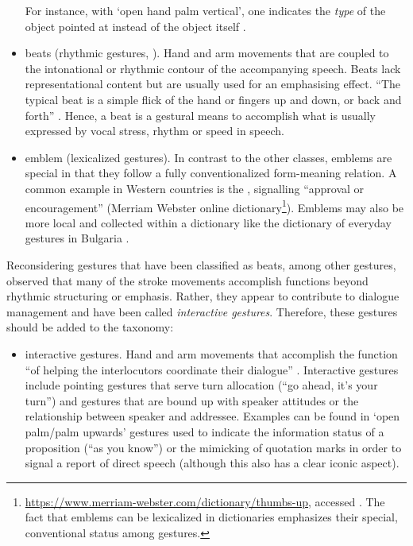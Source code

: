 \documentclass[output=paper]{langsci/langscibook}
\begin{document}
\begin{itemize}
%
For instance, with \enquote*{open hand palm vertical}, one indicates the \emph{type} of the object pointed at instead of the object itself \citep[]{Kendon:Versante:2003}.
\item beats  (rhythmic gestures, ). Hand and arm movements that are coupled to the intonational or rhythmic contour of the accompanying speech. Beats lack representational content but are usually used for an emphasising effect. \enquote{The typical beat is a simple flick of the hand or fingers up and down, or back and forth} \citep[]{McNeill:1992}. Hence, a beat is a gestural means to accomplish what is usually expressed by vocal stress, rhythm or speed in speech. 
\item emblem (lexicalized gestures). In contrast to the other classes, emblems are special in that they follow a fully conventionalized form-meaning relation. A common example in Western countries is the , signalling \enquote{approval or encouragement} (Merriam Webster online dictionary\footnote{\url{https://www.merriam-webster.com/dictionary/thumbs-up}, accessed . The fact that emblems can be lexicalized in dictionaries emphasizes their special, conventional status among gestures.}). Emblems may also be more local and collected within a dictionary like the dictionary of everyday gestures in Bulgaria \citep{Kolarova:2011}.
\end{itemize}


Reconsidering gestures that have been classified as beats, among other gestures, \citet{Bavelas:Chovil:Lawrie:Wade:1992} observed that many of the stroke movements accomplish functions beyond rhythmic structuring or emphasis.
%
Rather, they appear to contribute to dialogue management and have been called \emph{interactive gestures}.
%
Therefore, these gestures should be added to the taxonomy:

\begin{itemize}
\item interactive gestures.  Hand and arm movements that accomplish the function \enquote{of helping the interlocutors coordinate their dialogue} \citep[]{Bavelas:Chovil:Coates:Roe:1995}. Interactive gestures include pointing gestures that serve turn allocation (\enquote{go ahead, it's your turn}) and gestures that are bound up with speaker attitudes or the relationship between speaker and addressee. Examples can be found in \enquote*{open palm/palm upwards} gestures used to indicate the information status of a proposition (\enquote{as you know}) or the mimicking of quotation marks in order to signal a report of direct speech (although this also has a clear iconic aspect).
\end{itemize}
\end{document}
